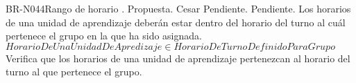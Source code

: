 \begin{BusinessRule}{BR-N044}{Rango de horario}
	{\bcCondition}    %
	{\btEnabler}     %
	{\blControlling}    %
	.
	\BRItem[Estado] Propuesta.
	 Cesar
	 Pendiente.
	 Pendiente.
	\BRItem[Descripción] Los horarios de una unidad de aprendizaje deberán estar dentro del horario del turno al cuál pertenece el grupo en la que ha sido asignada.
	\BRItem[Sentencia]  $HorarioDeUnaUnidadDeApredizaje \in HorarioDeTurnoDefinidoParaGrupo$
	\BRItem[Motivación] Verifica que los horarios de una unidad de aprendizaje pertenezcan al horario del turno al que pertenece el grupo.
\end{BusinessRule}

